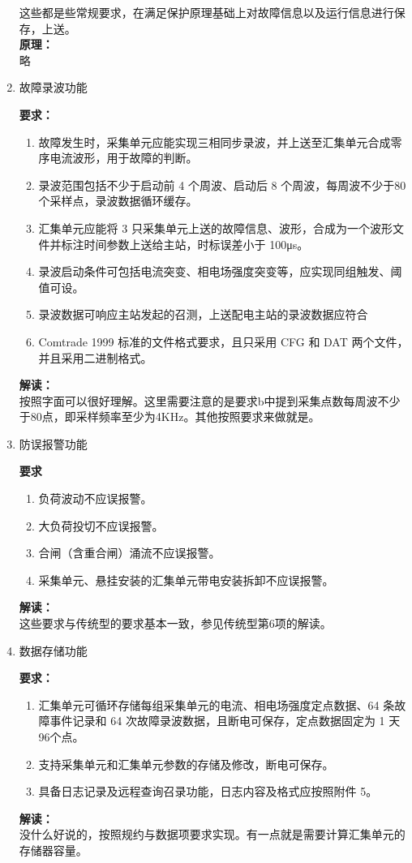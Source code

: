 \documentclass{article}
\begin{document}
\begin{CJK}{UTF8}{gbsn}
\begin{enumerate}
		这些都是些常规要求，在满足保护原理基础上对故障信息以及运行信息进行保存，上送。\\
		\textbf{原理：}\\
		略
	\item 故障录波功能
		\par
		\textbf{要求：}
			\begin{enumerate}
				\item 故障发生时，采集单元应能实现三相同步录波，并上送至汇集单元合成零序电流波形，用于故障的判断。 
				\item 录波范围包括不少于启动前 4 个周波、启动后 8 个周波，每周波不少于80 个采样点，录波数据循环缓存。 
				\item 汇集单元应能将 3 只采集单元上送的故障信息、波形，合成为一个波形文件并标注时间参数上送给主站，时标误差小于 100μs。 
				\item 录波启动条件可包括电流突变、相电场强度突变等，应实现同组触发、阈值可设。 
				\item 录波数据可响应主站发起的召测，上送配电主站的录波数据应符合
				\item Comtrade 1999 标准的文件格式要求，且只采用 CFG 和 DAT 两个文件，并且采用二进制格式。 
		\end{enumerate}
		\textbf{解读：}\\
		按照字面可以很好理解。这里需要注意的是要求b中提到采集点数每周波不少于80点，即采样频率至少为4KHz。其他按照要求来做就是。
	\item 防误报警功能 
		\par
		\textbf{要求}
		\begin{enumerate}
		\item 负荷波动不应误报警。 
		\item 大负荷投切不应误报警。 
		\item 合闸（含重合闸）涌流不应误报警。 
		\item 采集单元、悬挂安装的汇集单元带电安装拆卸不应误报警。 
		\end{enumerate}
		\textbf{解读：}\\
		这些要求与传统型的要求基本一致，参见传统型第6项的解读。


	\item 数据存储功能 
		\par
		\textbf{要求：}
		\begin{enumerate}
		\item 汇集单元可循环存储每组采集单元的电流、相电场强度定点数据、64 条故障事件记录和 64 次故障录波数据，且断电可保存，定点数据固定为 1 天 96个点。 
		\item 支持采集单元和汇集单元参数的存储及修改，断电可保存。 
		\item 具备日志记录及远程查询召录功能，日志内容及格式应按照附件 5。 
		\end{enumerate}
		\textbf{解读：}\\
		没什么好说的，按照规约与数据项要求实现。有一点就是需要计算汇集单元的存储器容量。


\end{enumerate}
\end{CJK}
\end{document}
